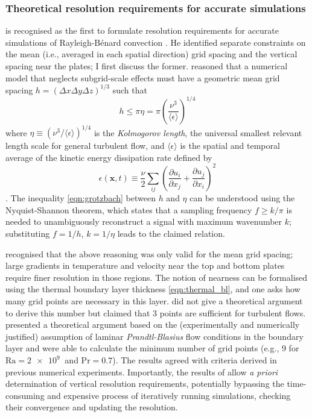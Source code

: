 \documentclass[titlepage,twoside]{article}
\numberwithin{equation}{section}
\newcommand{\pdiff}[2]{\frac{\partial #1}{\partial #2}}
\renewcommand\vec{\bm}
\newcommand{\prandtl}{\ensuremath{\mathrm{Pr}}}
\newcommand{\rayleigh}{\ensuremath{\mathrm{Ra}}}
\newcommand{\rb}{Rayleigh-B\'{e}nard}
\begin{document}
\subsubsection{Theoretical resolution requirements for accurate simulations}%
\label{sec:res_requirements}

\textcite{grotzbach1983} is recognised as the first to formulate resolution
requirements for accurate simulations of \rb{} convection
\parencite{chilla2012,scheel2013}. He identified separate constraints on the
mean (i.e., averaged in each spatial direction) grid spacing and the vertical
spacing near the plates; I first discuss the former.
\citeauthor{grotzbach1983} reasoned that a numerical model that neglects
subgrid-scale effects must have a geometric mean grid spacing $h = (\Delta x
\Delta y \Delta z)^{1/3}$ such that
\begin{equation}
    \label{eqn:grotzbach}
    h \leq \pi \eta = \pi \left(
        \frac{\nu^3}{\langle \epsilon \rangle}
    \right)^{1/4}
\end{equation}
where $\eta \equiv (\nu^3/\langle \epsilon \rangle)^{1/4}$ is the \emph{Kolmogorov length}, the
universal smallest relevant length scale for general turbulent flow, and
$\langle \epsilon \rangle$ is the spatial and temporal average of the kinetic
energy dissipation rate defined by
\begin{equation}
    \label{eqn:kinetic_dissipation}
    \epsilon(\vec{x}, t) \equiv \frac{\nu}{2} \sum_{ij} \left(
        \pdiff{u_i}{x_j} + \pdiff{u_j}{x_i}
    \right)^2
\end{equation}
\parencite{chilla2012}. The inequality \cref{eqn:grotzbach} between $h$ and $\eta$ can be
understood using the Nyquist-Shannon theorem, which states that a
sampling frequency $f \geq k/\pi$ is needed to unambiguously reconstruct
a signal with maximum wavenumber $k$; substituting $f = 1/h$, $k =
1/\eta$ leads to the claimed relation.

\citeauthor{grotzbach1983} recognised that the above reasoning was only valid
for the mean grid spacing; large gradients in temperature and velocity near the
top and bottom plates require finer resolution in those regions. The notion of
nearness can be formalised using the thermal boundary layer thickness
\cref{eqn:thermal_bl}, and one asks how many grid points are necessary in this
layer. \citeauthor{grotzbach1983} did not give a theoretical argument to derive
this number but claimed that 3 points are sufficient for turbulent flows.
\textcite{shishkina2010} presented a theoretical argument based on the
(experimentally and numerically justified) assumption of laminar
\emph{Prandtl-Blasius} flow conditions in the boundary layer and were able to
calculate the minimum number of grid points (e.g., 9 for $\rayleigh =
\SI{2e9}{}$ and $\prandtl = 0.7$). The results agreed with criteria derived in
previous numerical experiments. Importantly, the results of
\citeauthor{shishkina2010} allow \emph{a priori} determination of vertical
resolution requirements, potentially bypassing the time-consuming and expensive
process of iteratively running simulations, checking their convergence and
updating the resolution.
\end{document}
